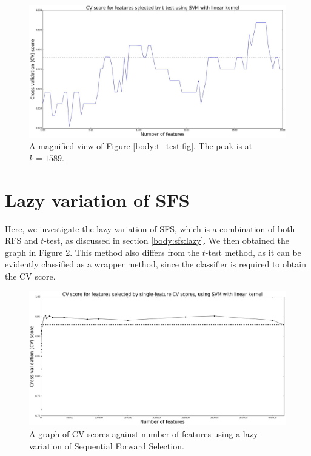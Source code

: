 \documentclass[12pt, twoside, a4paper]{report}
\begin{document}
\begin{figure}
\centering
\includegraphics[width=\textwidth]{images/t_test_2000_uneq_var_zoom.jpeg}
\caption{A magnified view of Figure \ref{body:t_test:fig}. The peak is at $k=1589$.}
\label{body:t_test:fig_zoom}
\end{figure}

\section{Lazy variation of SFS}
Here, we investigate the lazy variation of SFS, which is a combination of both RFS and $t$-test, as discussed in section \ref{body:sfs:lazy}. We then obtained the graph in Figure \ref{body:lazy_sfs:graph}. This method also differs from the $t$-test method, as it can be evidently classified as a wrapper method, since the classifier is required to obtain the CV score.

\begin{figure}
\centering
\includegraphics[width=\textwidth]{images/lazy_sfs_range.jpeg}
\caption{A graph of CV scores against number of features using a lazy variation of Sequential Forward Selection.}
\label{body:lazy_sfs:graph}
\end{figure}
\end{document}
